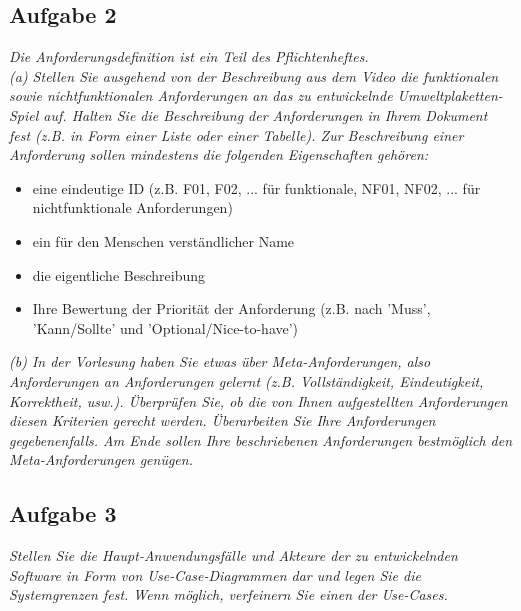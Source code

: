 \documentclass{article}
\begin{document}
\subsection{Aufgabe 2}
\textit{Die Anforderungsdefinition ist ein Teil des Pflichtenheftes.}\\
\textit{(a) Stellen Sie ausgehend von der Beschreibung aus dem Video die funktionalen sowie nichtfunktionalen Anforderungen an das zu entwickelnde Umweltplaketten-Spiel
auf. Halten Sie die Beschreibung der Anforderungen in Ihrem Dokument fest (z.B. in Form einer Liste oder einer Tabelle). Zur Beschreibung einer Anforderung sollen mindestens die folgenden Eigenschaften gehören:}\\
\begin{itemize}
    \item eine eindeutige ID (z.B. F01, F02, ... für funktionale, NF01, NF02, ... für nichtfunktionale Anforderungen)
    \item ein für den Menschen verständlicher Name
    \item die eigentliche Beschreibung
    \item Ihre Bewertung der Priorität der Anforderung (z.B. nach ’Muss’, ’Kann/Sollte’ und ’Optional/Nice-to-have’)
\end{itemize}
\textit{(b) In der Vorlesung haben Sie etwas über Meta-Anforderungen, also Anforderungen an Anforderungen gelernt (z.B. Vollständigkeit, Eindeutigkeit, Korrektheit, usw.). Überprüfen Sie, ob die von Ihnen aufgestellten Anforderungen diesen Kriterien gerecht werden. Überarbeiten Sie Ihre Anforderungen gegebenenfalls. Am Ende sollen Ihre beschriebenen Anforderungen bestmöglich den Meta-Anforderungen genügen.}\\


\subsection{Aufgabe 3}
\textit{Stellen Sie die Haupt-Anwendungsfälle und Akteure der zu entwickelnden Software in Form von Use-Case-Diagrammen dar und legen Sie die Systemgrenzen fest. Wenn möglich, verfeinern Sie einen der Use-Cases.}\\

\newpage
\end{document}
